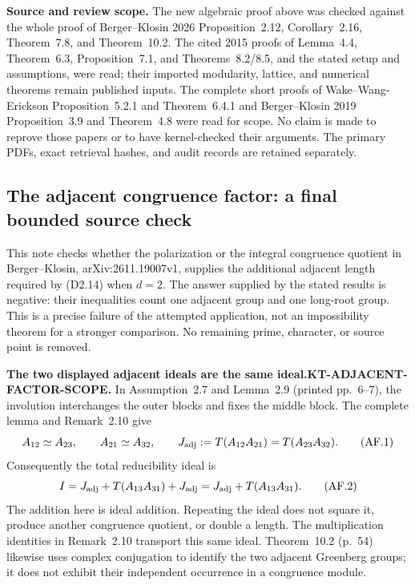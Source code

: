 \documentclass[11pt,a4paper]{article}
\theoremstyle{definition}
\renewcommand{\paragraph}[1]{\par\smallskip\noindent\textbf{#1}\quad\ignorespaces}
\begin{document}
\paragraph{Source and review scope.}
The new algebraic proof above was checked against the whole
proof of Berger--Klosin 2026 Proposition~2.12, Corollary~2.16,
Theorem~7.8, and Theorem~10.2.  The cited 2015 proofs of
Lemma~4.4, Theorem~6.3, Proposition~7.1, and
Theorems~8.2/8.5, and the stated setup and assumptions, were
read; their imported modularity, lattice, and numerical
theorems remain published inputs.  The complete short
proofs of Wake--Wang-Erickson Proposition~5.2.1 and
Theorem~6.4.1 and Berger--Klosin 2019 Proposition~3.9 and
Theorem~4.8 were read for scope.  No claim is made to
reprove those papers or to have kernel-checked their
arguments.  The primary PDFs, exact retrieval hashes, and
audit records are retained separately.



\subsection{The adjacent congruence factor: a final bounded source check}

This note checks whether the polarization or the integral congruence
quotient in Berger--Klosin, arXiv:2611.19007v1, supplies the additional
adjacent length required by (D2.14) when $d=2$.  The answer supplied by
the stated results is negative: their inequalities count one adjacent
group and one long-root group.  This is a precise failure of the
attempted application, not an impossibility theorem for a stronger
comparison.  No remaining prime, character, or source point is removed.

\paragraph{The two displayed adjacent ideals are the same ideal.}\textbf{KT-ADJACENT-FACTOR-SCOPE.} 
In Assumption~2.7 and Lemma~2.9 (printed pp.~6--7), the involution
interchanges the outer blocks and fixes the middle block.  The complete
lemma and Remark~2.10 give
\[
 A_{12}\simeq A_{23},\qquad A_{21}\simeq A_{32},\qquad
 J_{\rm adj}:=T(A_{12}A_{21})=T(A_{23}A_{32}).                 \tag{AF.1}
\]
Consequently the total reducibility ideal is
\[
 I=J_{\rm adj}+T(A_{13}A_{31})+J_{\rm adj}
   =J_{\rm adj}+T(A_{13}A_{31}).                              \tag{AF.2}
\]
The addition here is ideal addition.  Repeating the ideal does not
square it, produce another congruence quotient, or double a length.
The multiplication identities in Remark~2.10 transport this same ideal.
Theorem~10.2 (p.~54) likewise uses complex conjugation to identify the
two adjacent Greenberg groups; it does not exhibit their independent
occurrence in a congruence module.
\end{document}
